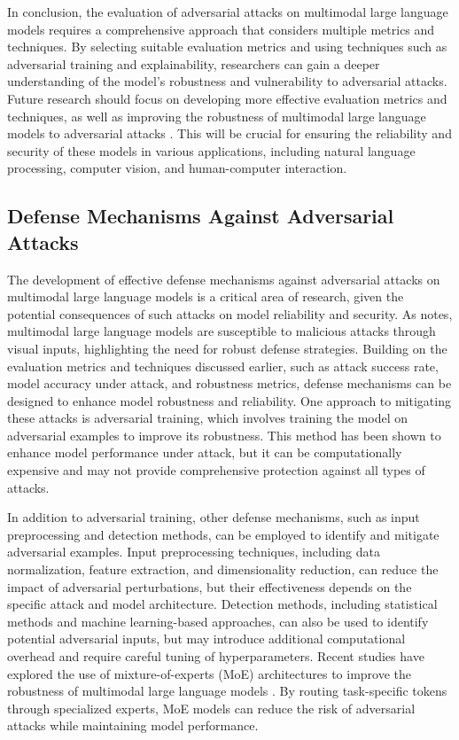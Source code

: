 \documentclass[11pt,a4paper]{article}
\begin{document}
In conclusion, the evaluation of adversarial attacks on multimodal large language models requires a comprehensive approach that considers multiple metrics and techniques. By selecting suitable evaluation metrics and using techniques such as adversarial training and explainability, researchers can gain a deeper understanding of the model's robustness and vulnerability to adversarial attacks. Future research should focus on developing more effective evaluation metrics and techniques, as well as improving the robustness of multimodal large language models to adversarial attacks \cite{arxiv:2409.18991}. This will be crucial for ensuring the reliability and security of these models in various applications, including natural language processing, computer vision, and human-computer interaction.


\subsection{Defense Mechanisms Against Adversarial Attacks}


The development of effective defense mechanisms against adversarial attacks on multimodal large language models is a critical area of research, given the potential consequences of such attacks on model reliability and security. As \cite{arxiv:2401.02906} notes, multimodal large language models are susceptible to malicious attacks through visual inputs, highlighting the need for robust defense strategies. Building on the evaluation metrics and techniques discussed earlier, such as attack success rate, model accuracy under attack, and robustness metrics, defense mechanisms can be designed to enhance model robustness and reliability. One approach to mitigating these attacks is adversarial training, which involves training the model on adversarial examples to improve its robustness. This method has been shown to enhance model performance under attack, but it can be computationally expensive and may not provide comprehensive protection against all types of attacks.

In addition to adversarial training, other defense mechanisms, such as input preprocessing and detection methods, can be employed to identify and mitigate adversarial examples. Input preprocessing techniques, including data normalization, feature extraction, and dimensionality reduction, can reduce the impact of adversarial perturbations, but their effectiveness depends on the specific attack and model architecture. Detection methods, including statistical methods and machine learning-based approaches, can also be used to identify potential adversarial inputs, but may introduce additional computational overhead and require careful tuning of hyperparameters. Recent studies have explored the use of mixture-of-experts (MoE) architectures to improve the robustness of multimodal large language models \cite{arxiv:2103.00265}. By routing task-specific tokens through specialized experts, MoE models can reduce the risk of adversarial attacks while maintaining model performance.
\end{document}
